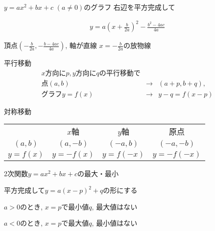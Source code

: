 \documentclass[aspectratio=169, 12pt]{beamer} %
\begin{document}
\begin{frame}{$y=ax^2+bx+c$ $ (a\neq 0)$のグラフ}
    右辺を平方完成して \par
    \begin{eqnarray*}
        y=a\left( x+\frac{b}{2a} \right) ^2 -\frac{b^2-4ac}{4a}
    \end{eqnarray*}
    \begin{center}
        頂点$\left(-\frac{b}{2a}, -\frac{b-4ac}{4a}\right)$,
        軸が直線 $x=-\frac{b}{2a}$の放物線
    \end{center}
\end{frame}
\begin{frame}{平行移動}
    \begin{eqnarray*}
        x方向にp, y方向にqの平行移動で \\
        点(a,b)&\rightarrow& (a+p, b+q), \\
        グラフ y=f(x) &\rightarrow& y-q=f(x-p)
    \end{eqnarray*}
\end{frame}
\begin{frame}{対称移動}
    \begin{table}[h]
        \centering
        \begin{tabular}{cccc}
                     & $x$軸      & $y$軸      & 原点         \\
            $(a,b)$  & $(a, -b)$ & $(-a, b)$ & $(-a, -b)$ \\
            $y=f(x)$ & $y=-f(x)$ & $y=f(-x)$ & $y=-f(-x)$
        \end{tabular}
    \end{table}
\end{frame}
\begin{frame}{2次関数$y=ax^2+bx+c$の最大・最小}
    \begin{center}
        平方完成して$y=a(x-p)^2+q$の形にする \par
        $a>0$のとき, $x=p$で最小値$q$, 最大値はない\par
        $a<0$のとき,  $x=p$で最大値$q$, 最小値はない
    \end{center}
\end{frame}
\end{document}
